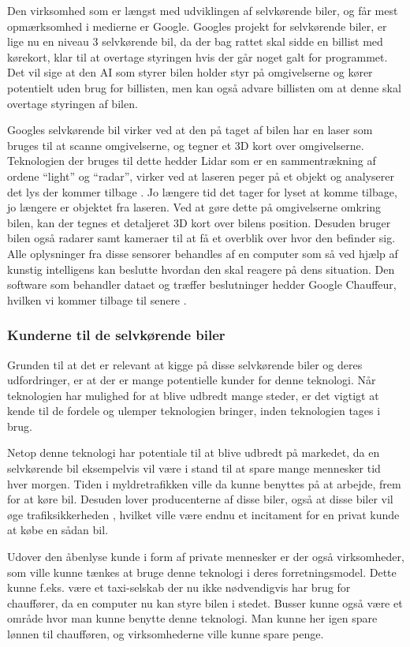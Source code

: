 Den virksomhed som er længst med udviklingen af selvkørende biler, og får mest opmærksomhed i medierne er Google. Googles projekt for selvkørende biler, er lige nu en niveau 3 selvkørende bil, da der bag rattet skal sidde en billist med kørekort, klar til at overtage styringen hvis der går noget galt for programmet. Det vil sige at den AI som styrer bilen holder styr på omgivelserne og kører potentielt uden brug for billisten, men kan også advare billisten om at denne skal overtage styringen af bilen.

Googles selvkørende bil virker ved at den på taget af bilen har en laser som bruges til at scanne omgivelserne, og tegner et 3D kort over omgivelserne. Teknologien der bruges til dette hedder Lidar som er en sammentrækning af ordene ``light'' og ``radar'', virker ved at laseren peger på et objekt og analyserer det lys der kommer tilbage \cite{Lidar}. Jo længere tid det tager for lyset at komme tilbage, jo længere er objektet fra laseren. Ved at gøre dette på omgivelserne omkring bilen, kan der tegnes et detaljeret 3D kort over bilens position. Desuden bruger bilen også radarer samt kameraer til at få et overblik over hvor den befinder sig. Alle oplysninger fra disse sensorer behandles af en computer som så ved hjælp af kunstig intelligens kan beslutte hvordan den skal reagere på dens situation. Den software som behandler dataet og træffer beslutninger hedder Google Chauffeur, hvilken vi kommer tilbage til senere \cite{GooglePatent}.

\subsubsection{Kunderne til de selvkørende biler}
Grunden til at det er relevant at kigge på disse selvkørende biler og deres udfordringer, er at der er mange potentielle kunder for denne teknologi. Når teknologien har mulighed for at blive udbredt mange steder, er det vigtigt at kende til de fordele og ulemper teknologien bringer, inden teknologien tages i brug.

Netop denne teknologi har potentiale til at blive udbredt på markedet, da en selvkørende bil eksempelvis vil være i stand til at spare mange mennesker tid hver morgen. Tiden i myldretrafikken ville da kunne benyttes på at arbejde, frem for at køre bil. Desuden lover producenterne af disse biler, også at disse biler vil øge trafiksikkerheden \cite{GOOG_SITE}, hvilket ville være endnu et incitament for en privat kunde at købe en sådan bil.

Udover den åbenlyse kunde i form af private mennesker er der også virksomheder, som ville kunne tænkes at bruge denne teknologi i deres forretningsmodel. Dette kunne f.eks. være et taxi-selskab der nu ikke nødvendigvis har brug for chauffører, da en computer nu kan styre bilen i stedet. Busser kunne også være et område hvor man kunne benytte denne teknologi. Man kunne her igen spare lønnen til chaufføren, og virksomhederne ville kunne spare penge.

